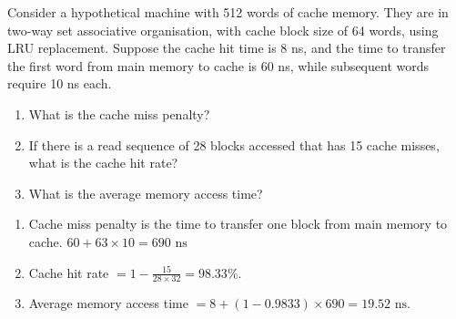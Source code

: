 \begin{example}
    Consider a hypothetical machine with 512 words of cache memory. They are in two-way
    set associative organisation, with cache block size of 64 words, using LRU replacement.
    Suppose the cache hit time is 8 ns, and the time to transfer the first word from main
    memory to cache is 60 ns, while subsequent words require 10 ns each. 
    \begin{enumerate}
        \item What is the cache miss penalty?
        \item If there is a read sequence of 28 blocks accessed that has 15 cache misses,
            what is the cache hit rate?
        \item What is the average memory access time?
    \end{enumerate}

    \begin{solution}
    \begin{enumerate}
        \item Cache miss penalty is the time to transfer one block from main memory to cache.
            $60+63\times10=\boxed{690\text{ ns}}$
        \item Cache hit rate $=1-\frac{15}{28\times32}=\boxed{98.33\%}$.
        \item Average memory access time $=8+(1-0.9833)\times690=\boxed{19.52\text{ ns}}$.
    \end{enumerate}
    \end{solution}
\end{example}